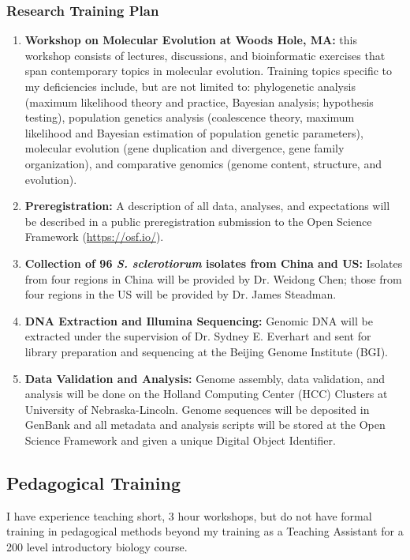 \documentclass[12pt,letterpaper]{article}
\begin{document}
\subsubsection*{Research Training Plan}

\begin{enumerate}
  \item \textbf{Workshop on Molecular Evolution at Woods Hole, MA:} this workshop consists of lectures, discussions, and bioinformatic exercises that span contemporary topics in molecular evolution. Training topics specific to my deficiencies include, but are not limited to: phylogenetic analysis (maximum likelihood theory and practice, Bayesian analysis; hypothesis testing), population genetics analysis (coalescence theory, maximum likelihood and Bayesian estimation of population genetic parameters), molecular evolution (gene duplication and divergence, gene family organization), and comparative genomics (genome content, structure, and evolution).
  \item \textbf{Preregistration:} A description of all data, analyses, and expectations will be described in a public preregistration submission to the Open Science Framework (\url{https://osf.io/}).
  \item \textbf{Collection of 96 \textit{S. sclerotiorum} isolates from China and US:} Isolates from four regions in China will be provided by Dr. Weidong Chen; those from four regions in the US will be provided by Dr. James Steadman. 
  \item \textbf{DNA Extraction and Illumina Sequencing:} Genomic DNA will be extracted under the supervision of Dr. Sydney E. Everhart and sent for library preparation and sequencing at the Beijing Genome Institute (BGI). 
  \item \textbf{Data Validation and Analysis:} Genome assembly, data validation,
  and analysis will be done on the Holland Computing Center (HCC) Clusters at University of Nebraska-Lincoln. Genome sequences will be deposited in GenBank and all metadata and analysis scripts will be stored at the Open Science Framework and given a unique Digital Object Identifier.
\end{enumerate}

\subsection{Pedagogical Training}

I have experience teaching short, 3 hour workshops, but do not have formal training in pedagogical methods beyond my training as a Teaching Assistant for a 200 level introductory biology course. 
\end{document}
